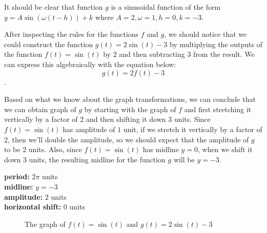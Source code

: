 \begin{solution}
	\label{sol:transform_the_graph_of_f_to_g}

	It should be clear that function $g$ is a sinusoidal function of the form
	$y = A\sin(\omega(t - h)) + k$ where $A = 2, \omega = 1, h = 0, k = -3$.

	After inspecting the rules for the functions $f$ and $g$, we should notice
	that we could construct the function $g(t) = 2\sin(t) - 3$ by multiplying the
	outputs of the function $f(t) = \sin(t)$ by $2$ and then subtracting $3$ from
	the result. We can express this algebraically with the equation below:
	\[ g(t) = 2 f(t) - 3 \].

	Based on what we know about the graph transformations, we can conclude that we
	can obtain graph of $g$ by starting with the graph of $f$ and first stretching
	it vertically by a factor of $2$ and then shifting it down $3$ units. Since
	$f(t) = \sin(t)$ has amplitude of $1$ unit, if we stretch it vertically by a
	factor of $2$, then we'll double the amplitude, so we should expect that the
	amplitude of $g$ to be $2$ units. Also, since $f(t) = \sin(t)$ has midline $y
		= 0$, when we shift it down $3$ units, the resulting midline for the function
	$g$ will be $y = -3$.

	\begin{center}
		\textbf{period:} $2\pi$ units \\
		\textbf{midline:} $y = -3$ \\
		\textbf{amplitude:} $2$ units \\
		\textbf{horizontal shift:} $0$ units
	\end{center}

	\begin{figure}[H]
		\centering


		\caption{The graph of {\color{red}$f(t) = \sin(t)$} and {\color{blue}$g(t) = 2\sin(t) - 3$}}
		\label{fig:the_graph_of_y_cos_theta_and_y_sin_theta_1}
	\end{figure}
\end{solution}

